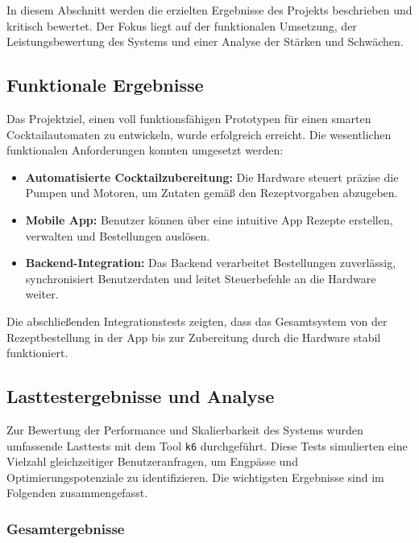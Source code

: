 In diesem Abschnitt werden die erzielten Ergebnisse des Projekts beschrieben und kritisch bewertet. 
Der Fokus liegt auf der funktionalen Umsetzung, der Leistungsbewertung des Systems und einer Analyse 
der Stärken und Schwächen.

\subsection{Funktionale Ergebnisse}

Das Projektziel, einen voll funktionsfähigen Prototypen für einen smarten Cocktailautomaten zu 
entwickeln, wurde erfolgreich erreicht. Die wesentlichen funktionalen Anforderungen konnten 
umgesetzt werden:

\begin{itemize}
  \item \textbf{Automatisierte Cocktailzubereitung:} Die Hardware steuert präzise die \\Pumpen und 
  Motoren, um Zutaten gemäß den Rezeptvorgaben abzugeben.
  \item \textbf{Mobile App:} Benutzer können über eine intuitive App Rezepte erstellen, verwalten 
  und Bestellungen auslösen.
  \item \textbf{Backend-Integration:} Das Backend verarbeitet Bestellungen zuverlässig, 
  \\synchronisiert Benutzerdaten und leitet Steuerbefehle an die Hardware \\weiter.
\end{itemize}

Die abschließenden Integrationstests zeigten, dass das Gesamtsystem von der Rezeptbestellung in der 
App bis zur Zubereitung durch die Hardware stabil \\funktioniert.

\subsection{Lasttestergebnisse und Analyse}

Zur Bewertung der Performance und Skalierbarkeit des Systems wurden umfassende Lasttests mit dem 
Tool \texttt{k6} durchgeführt. Diese Tests simulierten eine Vielzahl gleichzeitiger 
Benutzeranfragen, um Engpässe und Optimierungspotenziale zu identifizieren. Die wichtigsten 
Ergebnisse sind im Folgenden zusammengefasst.

\subsubsection*{Gesamtergebnisse}

